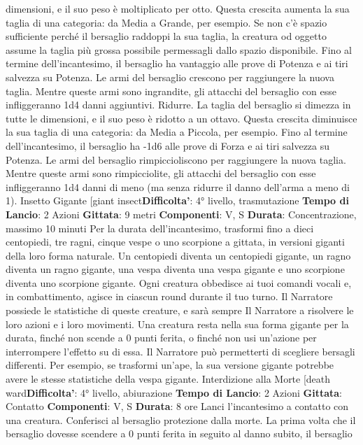 \begin{multicols}{2}
dimensioni, e il suo peso è moltiplicato per otto. Questa
crescita aumenta la sua taglia di una categoria: da
Media a Grande, per esempio. Se non c’è spazio
sufficiente perché il bersaglio raddoppi la sua taglia, la
creatura od oggetto assume la taglia più grossa
possibile permessagli dallo spazio disponibile. Fino al
termine dell’incantesimo, il bersaglio ha vantaggio alle
prove di Potenza e ai tiri salvezza su Potenza. Le armi del
bersaglio crescono per raggiungere la nuova taglia.
Mentre queste armi sono ingrandite, gli attacchi del
bersaglio con esse infliggeranno 1d4 danni aggiuntivi.
Ridurre. La taglia del bersaglio si dimezza in tutte le
dimensioni, e il suo peso è ridotto a un ottavo. Questa
crescita diminuisce la sua taglia di una categoria: da
Media a Piccola, per esempio. Fino al termine
dell’incantesimo, il bersaglio ha -1d6 alle prove di
Forza e ai tiri salvezza su Potenza. Le armi del bersaglio
rimpiccioliscono per raggiungere la nuova taglia. Mentre
queste armi sono rimpicciolite, gli attacchi del bersaglio
con esse infliggeranno 1d4 danni di meno (ma senza
ridurre il danno dell’arma a meno di 1).
Insetto Gigante
[giant insect\textbf{Difficolta'}:
4° livello, trasmutazione
\textbf{Tempo di Lancio}: 2 Azioni
\textbf{Gittata}: 9 metri
\textbf{Componenti}: V, S
\textbf{Durata}: Concentrazione, massimo 10 minuti
Per la durata dell’incantesimo, trasformi fino a dieci
centopiedi, tre ragni, cinque vespe o uno scorpione a
gittata, in versioni giganti della loro forma naturale. Un
centopiedi diventa un centopiedi gigante, un ragno
diventa un ragno gigante, una vespa diventa una vespa
gigante e uno scorpione diventa uno scorpione gigante.
Ogni creatura obbedisce ai tuoi comandi vocali e, in
combattimento, agisce in ciascun round durante il tuo
turno. Il Narratore possiede le statistiche di queste creature, e
sarà sempre Il Narratore a risolvere le loro azioni e i loro
movimenti.
Una creatura resta nella sua forma gigante per la
durata, finché non scende a 0 punti ferita, o finché non
usi un’azione per interrompere l’effetto su di essa.
Il Narratore può permetterti di scegliere bersagli differenti. Per
esempio, se trasformi un’ape, la sua versione gigante
potrebbe avere le stesse statistiche della vespa
gigante.
Interdizione alla Morte
[death ward\textbf{Difficolta'}:
4° livello, abiurazione
\textbf{Tempo di Lancio}: 2 Azioni
\textbf{Gittata}: Contatto
\textbf{Componenti}: V, S
\textbf{Durata}: 8 ore
Lanci l’incantesimo a contatto con una creatura.
Conferisci al bersaglio protezione dalla morte.
La prima volta che il bersaglio dovesse scendere a 0
punti ferita in seguito al danno subito, il bersaglio

\end{multicols}

